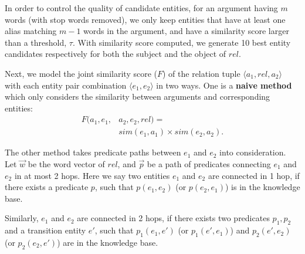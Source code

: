 
In order to control the quality of candidate entities,
for an argument having $m$ words (with stop words removed),
we only keep entities that have at least one alias
matching $m-1$ words in the argument, and have a similarity score larger than a threshold, $\tau$.
With similarity score computed, we generate 10 best entity candidates 
respectively for both the subject and the object of $rel$.

Next, we model the joint similarity score ($F$) of the relation tuple
$\langle a_1,rel,a_2\rangle$ with each entity pair combination $\langle e_1,e_2\rangle$ in two ways.
One is a \textbf{naive method} which only considers the similarity
between arguments and corresponding entities:
\begin{equation} \label{eqn:naive}
\begin{aligned}
F(a_1, e_1, &a_2, e_2, rel) = \\
            &sim(e_1, a_1) \times sim(e_2, a_2).
\end{aligned}
\end{equation}

The other method takes predicate paths between $e_1$ and $e_2$
into consideration.
Let $\vec{w}$ be the word vector of $rel$,
and $\vec{p}$ be a path of predicates connecting $e_1$ and $e_2$ in at most
2 hops. Here we say two entities $e_1$ and $e_2$ are connected in 1 hop,
if there exists a predicate $p$, such that $p(e_1, e_2)$ (or $p(e_2, e_1)$) is in the knowledge base.

Similarly, $e_1$ and $e_2$ are connected in 2 hops,
if there exists two predicates $p_1, p_2$ and a transition entity $e'$,
such that $p_1(e_1, e')$ (or $p_1(e', e_1)$) and $p_2(e', e_2)$ (or $p_2(e_2, e')$) are in the knowledge base.
 
